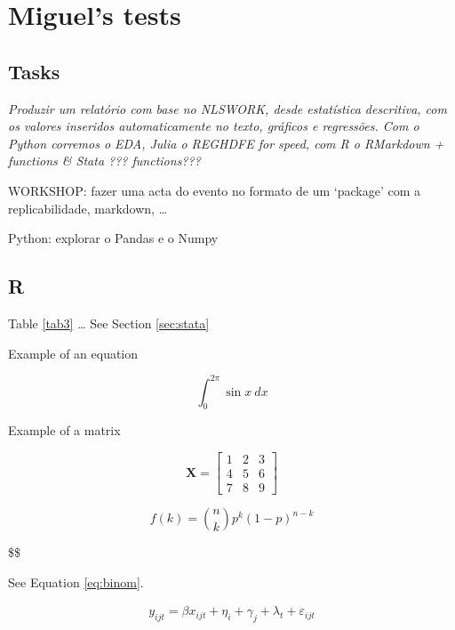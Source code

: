 \documentclass[
  12pt,
]{article}
\begin{document}
\begin{table}[ht]
\label{tab:hdfe}
  
\end{table}

\hypertarget{miguels-tests}{%
\section{Miguel's tests}\label{miguels-tests}}

\hypertarget{tasks}{%
\subsection{Tasks}\label{tasks}}

\emph{Produzir um relatório com base no NLSWORK, desde estatística descritiva, com os valores inseridos automaticamente no texto, gráficos e regressões. Com o Python corremos o EDA, Julia o REGHDFE for speed, com R o RMarkdown + functions \& Stata ??? functions???}

WORKSHOP: fazer uma acta do evento no formato de um `package' com a replicabilidade, markdown, \ldots{}

Python: explorar o Pandas e o Numpy

\hypertarget{r}{%
\subsection{R}\label{r}}

Table \ref{tab3} \ldots{} See Section \ref{sec:stata}

Example of an equation

\[\int_0^{2\pi} \sin x~dx\]

Example of a matrix

\[\mathbf{X} = \left[\begin{array}
{rrr}
1 & 2 & 3 \\
4 & 5 & 6 \\
7 & 8 & 9
\end{array}\right]
\]

\begin{equation}
f\left(k\right)=\binom{n}{k}p^k\left(1-p\right)^{n-k} \label{eq:binom}
\end{equation}

\$\$

See Equation \eqref{eq:binom}.

\begin{align}
y_{ijt} = \beta x_{ijt} + \eta_i + \gamma_j + \lambda_t + \varepsilon_{ijt}
\end{align}
\end{document}
